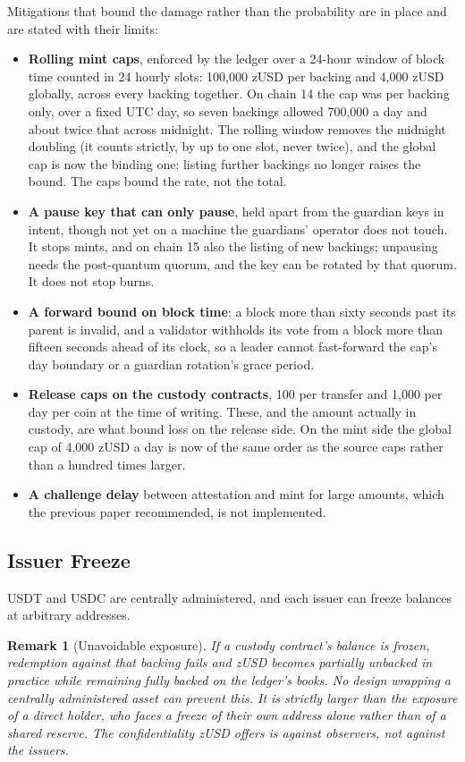 \documentclass[11pt,a4paper]{article}
\newtheorem{remark}[theorem]{Remark}
\begin{document}
Mitigations that bound the damage rather than the probability are in place and are stated with their limits:

\begin{itemize}
    \item \textbf{Rolling mint caps}, enforced by the ledger over a 24-hour window of block time counted in 24 hourly slots: 100,000 zUSD per backing and 4,000 zUSD globally, across every backing together. On chain 14 the cap was per backing only, over a fixed UTC day, so seven backings allowed 700,000 a day and about twice that across midnight. The rolling window removes the midnight doubling (it counts strictly, by up to one slot, never twice), and the global cap is now the binding one: listing further backings no longer raises the bound. The caps bound the rate, not the total.
    \item \textbf{A pause key that can only pause}, held apart from the guardian keys in intent, though not yet on a machine the guardians' operator does not touch. It stops mints, and on chain 15 also the listing of new backings; unpausing needs the post-quantum quorum, and the key can be rotated by that quorum. It does not stop burns.
    \item \textbf{A forward bound on block time}: a block more than sixty seconds past its parent is invalid, and a validator withholds its vote from a block more than fifteen seconds ahead of its clock, so a leader cannot fast-forward the cap's day boundary or a guardian rotation's grace period.
    \item \textbf{Release caps on the custody contracts}, 100 per transfer and 1,000 per day per coin at the time of writing. These, and the amount actually in custody, are what bound loss on the release side. On the mint side the global cap of 4,000 zUSD a day is now of the same order as the source caps rather than a hundred times larger.
    \item \textbf{A challenge delay} between attestation and mint for large amounts, which the previous paper recommended, is not implemented.
\end{itemize}

\subsection{Issuer Freeze}

USDT and USDC are centrally administered, and each issuer can freeze balances at arbitrary addresses.

\begin{remark}[Unavoidable exposure]
If a custody contract's balance is frozen, redemption against that backing fails and zUSD becomes partially unbacked in practice while remaining fully backed on the ledger's books. No design wrapping a centrally administered asset can prevent this. It is strictly larger than the exposure of a direct holder, who faces a freeze of their own address alone rather than of a shared reserve. The confidentiality zUSD offers is against observers, not against the issuers.
\end{remark}
\end{document}
